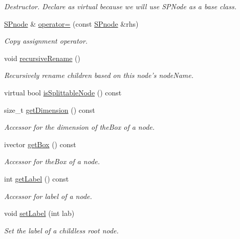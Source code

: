 \begin{DoxyCompactItemize}
\begin{DoxyCompactList}\small\item\em \-Destructor. \-Declare as virtual because we will use \-S\-P\-Node as a base class. \end{DoxyCompactList}\item 
\hyperlink{classsubpavings_1_1SPnode}{\-S\-Pnode} \& \hyperlink{classsubpavings_1_1SPnode_a6658537d790191fc8baae2b351cf9666}{operator=} (const \hyperlink{classsubpavings_1_1SPnode}{\-S\-Pnode} \&rhs)
\begin{DoxyCompactList}\small\item\em \-Copy assignment operator. \end{DoxyCompactList}\item 
void \hyperlink{classsubpavings_1_1SPnode_a84eef536420ee82e9b6ec4eb17a0b14e}{recursive\-Rename} ()
\begin{DoxyCompactList}\small\item\em \-Recursively rename children based on this node's node\-Name. \end{DoxyCompactList}\item 
virtual bool \hyperlink{classsubpavings_1_1SPnode_ac3e8e3499bcb0acb42181b781d7796b3}{is\-Splittable\-Node} () const 
\item 
size\-\_\-t \hyperlink{classsubpavings_1_1SPnode_a4caf34bf9db0dc8f116797149be0cf8b}{get\-Dimension} () const 
\begin{DoxyCompactList}\small\item\em \-Accessor for the dimension of the\-Box of a node. \end{DoxyCompactList}\item 
ivector \hyperlink{classsubpavings_1_1SPnode_a8ff024c82f00ff7420ba62005a5558ac}{get\-Box} () const 
\begin{DoxyCompactList}\small\item\em \-Accessor for the\-Box of a node. \end{DoxyCompactList}\item 
int \hyperlink{classsubpavings_1_1SPnode_accdcd56d02a9ff69c07aea07e16e8c8e}{get\-Label} () const 
\begin{DoxyCompactList}\small\item\em \-Accessor for label of a node. \end{DoxyCompactList}\item 
void \hyperlink{classsubpavings_1_1SPnode_a9ef7989599f223a312a371d8fb8527db}{set\-Label} (int lab)
\begin{DoxyCompactList}\small\item\em \-Set the label of a childless root node. \end{DoxyCompactList}\item 

\end{DoxyCompactItemize}
